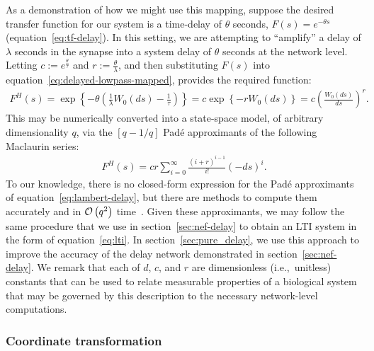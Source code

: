 As a demonstration of how we might use this mapping, suppose the desired transfer function for our system is a time-delay of $\theta$ seconds, $F(s) = e^{-\theta s}$ (equation~\ref{eq:tf-delay}).
In this setting, we are attempting to ``amplify'' a delay of $\lambda$ seconds in the synapse into a system delay of $\theta$ seconds at the network level.
Letting $c := e^{\frac{\theta}{\tau}}$ and $r := \frac{\theta}{\lambda}$, and then substituting $F(s)$ into equation~\ref{eq:delayed-lowpass-mapped}, provides the required function:
\begin{align}
F^H(s) = \exp \left\{ -\theta \left( \frac{1}{\lambda} W_0(ds) - \frac{1}{\tau} \right) \right\} = c \exp \left\{-r W_0(ds) \right\} = c \left( \frac{W_0(ds)}{ds} \right)^r \text{.} \nonumber
\end{align}
This may be numerically converted into a state-space model, of arbitrary dimensionality $q$, via the $\left[q-1/q\right]$ Pad\'e approximants of the following Maclaurin series:
\begin{align} \label{eq:lambert-delay}
F^H(s) = c r \sum_{i=0}^\infty \frac{(i+r)^{i-1}}{i!} (-ds)^i \text{.}
\end{align}
To our knowledge, there is no closed-form expression for the Pad\'e approximants of equation~\ref{eq:lambert-delay}, but there are methods to compute them accurately and in $\mathcal{O}\left({q^2}\right)$ time~\citep{sidi2003practical}.
Given these approximants, we may follow the same procedure that we use in section~\ref{sec:nef-delay} to obtain an LTI system in the form of equation~\ref{eq:lti}.
In section~\ref{sec:pure_delay}, we use this approach to improve the accuracy of the delay network demonstrated in section~\ref{sec:nef-delay}. %
We remark that each of $d$, $c$, and $r$ are dimensionless (i.e.,~unitless) constants that can be used to relate measurable properties of a biological system that may be governed by this description to the necessary network-level computations.

\subsubsection{Coordinate transformation}

